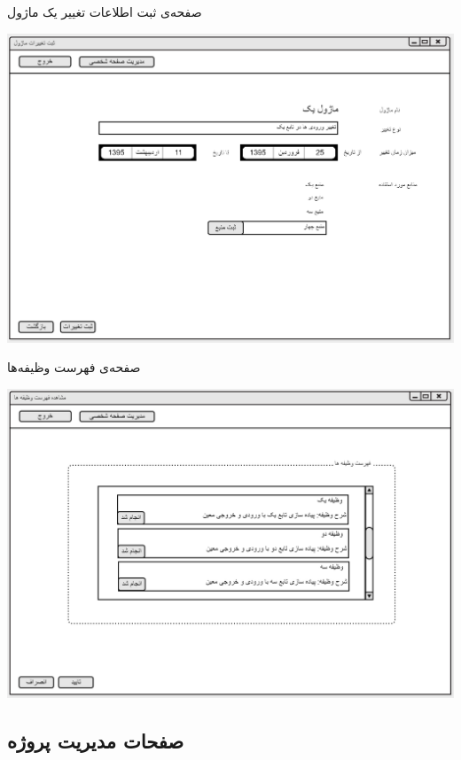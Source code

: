 \vspace{1cm}
صفحه‌ی ثبت اطلاعات تغییر یک ماژول
\begin{center}
\includegraphics[width=\textwidth]{Prototype/Employee/ChangeOneModule.png}
\end{center}

\newpage
\vspace{1cm}
صفحه‌ی فهرست وظیفه‌ها
\begin{center}
\includegraphics[width=\textwidth]{Prototype/Employee/TasksList.png}
\end{center}

\newpage
\subsection{صفحات مدیریت پروژه}

